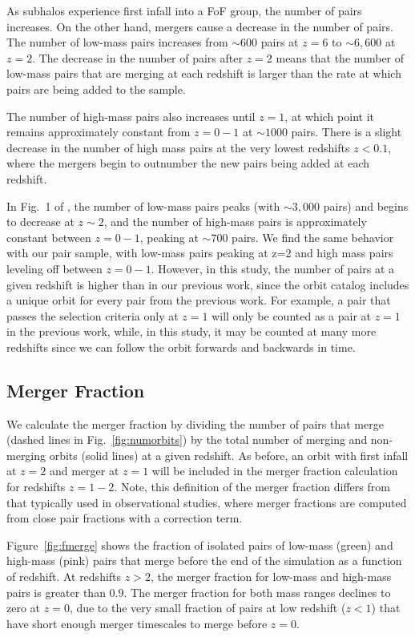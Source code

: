 \documentclass[twocolumn,linenumbers]{aastex631}
\newcommand{\chambe}{\citet{Chamberlain2024}}
\begin{document}
As subhalos experience first infall into a FoF group, the number of pairs increases. 
On the other hand, mergers cause a decrease in the number of pairs.
The number of low-mass pairs increases from $\sim600$ pairs at $z=6$ to $\sim6,600$ at $z=2$. 
The decrease in the number of pairs after $z=2$ means that the number of low-mass pairs that are merging at each redshift is larger than the rate at which pairs are being added to the sample.

The number of high-mass pairs also increases until $z=1$, at which point it remains approximately constant from $z=0-1$ at $\sim1000$ pairs. 
There is a slight decrease in the number of high mass pairs at the very lowest redshifts $z<0.1$, where the mergers begin to outnumber the new pairs being added at each redshift.

In Fig.~1 of \chambe{}, the number of low-mass pairs peaks (with $\sim3,000$ pairs) and begins to decrease at $z\sim2$, and the number of high-mass pairs is approximately constant between $z=0-1$, peaking at $\sim700$ pairs. 
We find the same behavior with our pair sample, with low-mass pairs peaking at z=2 and high mass pairs leveling off between $z=0-1$. 
However, in this study, the number of pairs at a given redshift is higher than in our previous work, since the orbit catalog includes a unique orbit for every pair from the previous work.
For example, a pair that passes the \chambe{} selection criteria only at $z=1$ will only be counted as a pair at $z=1$ in the previous work, while, in this study, it may be counted at many more redshifts since we can follow the orbit forwards and backwards in time. 

\subsection{Merger Fraction}\label{sec:pairprops-frac}
    We calculate the merger fraction by dividing the number of pairs that merge (dashed lines in Fig.~\ref{fig:numorbits}) by the total number of merging and non-merging orbits (solid lines) at a given redshift. 
    As before, an orbit with first infall at $z=2$ and merger at $z=1$ will be included in the merger fraction calculation for redshifts $z=1-2$.
    Note, this definition of the merger fraction differs from that typically used in observational studies, where merger fractions are computed from close pair fractions with a correction term. 
    
    Figure~\ref{fig:fmerge} shows the fraction of isolated pairs of low-mass (green) and high-mass (pink) pairs that merge before the end of the simulation as a function of redshift. 
    At redshifts $z>2$, the merger fraction for low-mass and high-mass pairs is greater than $0.9$.
    The merger fraction for both mass ranges declines to zero at $z=0$, due to the very small fraction of pairs at low redshift ($z<1$) that have short enough merger timescales to merge before $z=0$.
    
\end{document}
